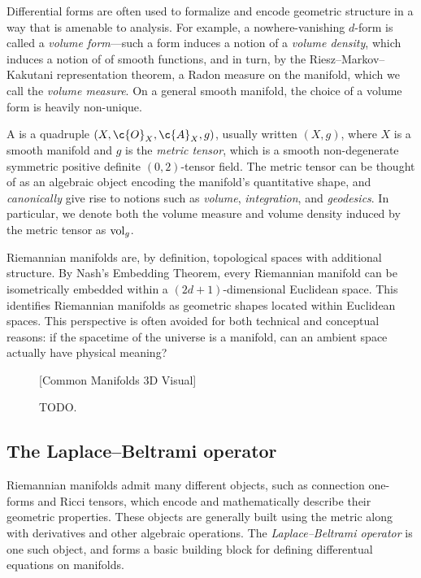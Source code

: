 \documentclass[11pt]{book}
\begin{document}
Differential forms are often used to formalize and encode geometric structure in a way that is amenable to analysis.
For example, a nowhere-vanishing $d$-form is called a \emph{volume form}---such a form induces a notion of a \emph{volume density}, which induces a notion of  of smooth functions, and in turn, by the Riesz--Markov--Kakutani representation theorem, a Radon measure on the manifold, which we call the \emph{volume measure}.
On a general smooth manifold, the choice of a volume form is heavily non-unique.

A  is a quadruple $(X,\c{O}_X,\c{A}_X,g)$, usually written $(X,g)$, where $X$ is a smooth manifold and $g$ is the \emph{metric tensor}, which is a smooth non-degenerate symmetric positive definite $(0,2)$-tensor field.
The metric tensor can be thought of as an algebraic object encoding the manifold's quantitative shape, and \emph{canonically} give rise to notions such as \emph{volume}, \emph{integration}, and \emph{geodesics}.
In particular, we denote both the volume measure and volume density induced by the metric tensor as $\operatorname{vol}_g$.

Riemannian manifolds are, by definition, topological spaces with additional structure.
By Nash's Embedding Theorem, every Riemannian manifold can be isometrically embedded within a $(2d+1)$-dimensional Euclidean space.
This identifies Riemannian manifolds as geometric shapes located within Euclidean spaces.
This perspective is often avoided for both technical and conceptual reasons: if the spacetime of the universe is a manifold, can an ambient space actually have physical meaning?

\begin{figure}
\vspace*{10ex}
[Common Manifolds 3D Visual]
\vspace*{10ex}
\caption{TODO.}
\end{figure}

\subsection{The Laplace--Beltrami operator}

Riemannian manifolds admit many different objects, such as connection one-forms and Ricci tensors, which encode and mathematically describe their geometric properties.
These objects are generally built using the metric along with derivatives and other algebraic operations.
The \emph{Laplace--Beltrami operator} is one such object, and forms a basic building block for defining differentual equations on manifolds.
\end{document}
